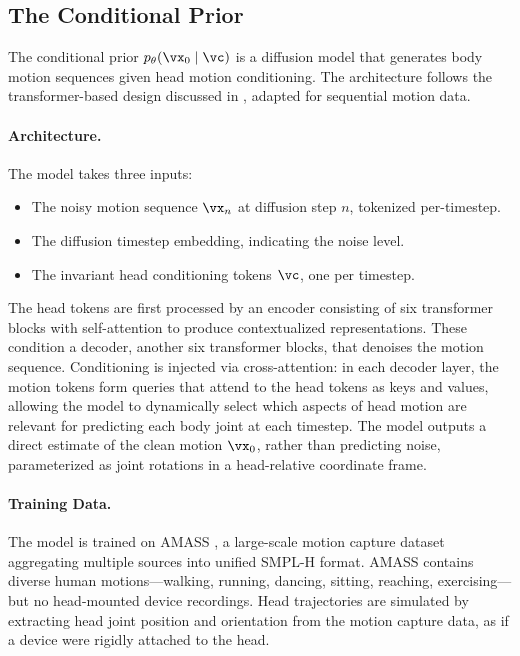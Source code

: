 \documentclass[../../book-main.tex]{subfiles}
\begin{document}
\subsection{The Conditional Prior}
\label{sub:egoallo_architecture}

The conditional prior \(p_{\theta}(\vx_{0} \mid \vc)\) is a
diffusion model that generates body motion sequences given head
motion conditioning. The architecture follows the transformer-based
design discussed in , adapted
for sequential motion data.

\paragraph{Architecture.}
The model takes three inputs:
\begin{itemize}
    \item The noisy motion sequence \(\vx_{n}\) at diffusion step
        \(n\), tokenized per-timestep.
    \item The diffusion timestep embedding, indicating the noise level.
    \item The invariant head conditioning tokens \(\vc\), one per timestep.
\end{itemize}

The head tokens are first processed by an encoder consisting of six
transformer blocks with self-attention to produce contextualized
representations. These condition a decoder, another six transformer
blocks, that denoises the motion sequence. Conditioning is injected
via cross-attention: in each decoder layer, the motion tokens form
queries that attend to the head tokens as keys and values, allowing
the model to dynamically select which aspects of head motion are
relevant for predicting each body joint at each timestep. The model
outputs a direct estimate of the clean motion \(\vx_{0}\), rather
than predicting noise, parameterized as joint rotations in a
head-relative coordinate frame.

\paragraph{Training Data.}
The model is trained on AMASS \citep{mahmood2019amass}, a large-scale
motion capture dataset aggregating multiple sources into unified
SMPL-H format. AMASS contains diverse human motions---walking,
running, dancing, sitting, reaching, exercising---but no head-mounted
device recordings. Head trajectories are simulated by extracting head
joint position and orientation from the motion capture data, as if a
device were rigidly attached to the head.
\end{document}
